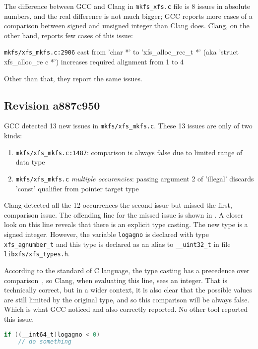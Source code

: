 The difference between GCC and Clang in {\tt mkfs\_xfs.c} file is 8 issues in
absolute numbers, and the real difference is not much bigger; GCC reports more
cases of a comparison between signed and unsigned integer than Clang does.
Clang, on the other hand, reports few cases of this issue:

{\tt mkfs/xfs\_mkfs.c:2906} cast from 'char *' to 'xfs\_alloc\_rec\_t *' (aka
'struct xfs\_alloc\_re    c *') increases required alignment from 1 to 4

Other than that, they report the same issues.

\subsection{Revision a887c950}\label{chap:results:gcc:a887c950}
GCC detected 13 new issues in {\tt mkfs/xfs\_mkfs.c}. These 13 issues are only of two
kinds:
\begin{enumerate}
	\item {\tt mkfs/xfs\_mkfs.c:1487}: comparison is always false due
		to limited range of data type
	\item {\tt mkfs/xfs\_mkfs.c} {\em multiple occurencies}: passing
		argument 2 of 'illegal' discards 'const' qualifier from
		pointer target type
\end{enumerate}

Clang detected all the 12 occurrences the second issue but missed the first,
comparison issue. The offending line for the missed issue is shown in
. A closer look on this line reveals that
there is an explicit type casting. The new type is a signed integer. However,
the variable {\tt logagno} is declared with type {\tt xfs\_agnumber\_t} and
this type is declared as an alias to {\tt \_\_uint32\_t} in file {\tt
libxfs/xfs\_types.h}.

According to the standard of C language, the type casting has a precedence over
comparison~\cite[A.2.1]{ISO9899}, so Clang, when evaluating this line, sees
an integer. That is technically correct, but in a wider context, it is also
clear that the possible values are still limited by the original type, and
so this comparison will be always false.  Which is what GCC noticed and
also correctly reported. No other tool reported this issue.


\begin{lstlisting}[frame=none, basicstyle=\footnotesize\ttfamily,
language=C, numbers=none, numberstyle=\tiny\color{black},caption=
{Line on which GCC found the comparison issue.},
label={lst:results:logagnoComparison}]
if ((__int64_t)logagno < 0)
	// do something
\end{lstlisting}

